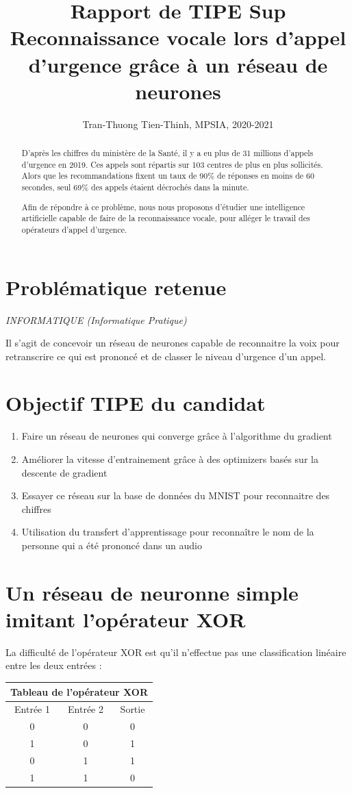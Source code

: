 \documentclass[12pt,a4paper, french]{article}
\title{Rapport de TIPE Sup \\
Reconnaissance vocale lors d'appel d'urgence grâce à un réseau de neurones}
\author{Tran-Thuong Tien-Thinh, MPSIA, 2020-2021}
\date{}
\begin{document}
\maketitle

\begin{abstract}
D'après les chiffres du ministère de la Santé, il y a eu plus de 31 millions d'appels d'urgence en 2019. Ces appels sont répartis sur 103 centres de plus en plus sollicités. Alors que les recommandations fixent un taux de 90\% de réponses en moins de 60 secondes, seul 69\% des appels étaient décrochés dans la minute.  

Afin de répondre à ce problème, nous nous proposons d'étudier une intelligence artificielle capable de faire de la reconnaissance vocale, pour alléger le travail des opérateurs d'appel d'urgence.
\end{abstract}

\section*{Problématique retenue}
\noindent\textit{INFORMATIQUE (Informatique Pratique)}

Il s’agit de concevoir un réseau de neurones capable de reconnaitre la voix pour retranscrire ce qui est prononcé et de classer le niveau d'urgence d'un appel.

\section*{Objectif TIPE du candidat}
\begin{enumerate}
    \item Faire un réseau de neurones qui converge grâce à l’algorithme du gradient
    \item Améliorer la vitesse d'entrainement grâce à des optimizers basés sur la descente de gradient
    \item Essayer ce réseau sur la base de données du MNIST pour reconnaitre des chiffres
    \item Utilisation du transfert d'apprentissage pour reconnaître le nom de la personne qui a été prononcé dans un audio
\end{enumerate}

\section{Un réseau de neuronne simple imitant l'opérateur XOR}
La difficulté de l'opérateur XOR est qu'il n'effectue pas une classification linéaire entre les deux entrées :
\begin{center}
\begin{tabular}{ |c|c||c|   }
 \hline
 \multicolumn{3}{|c|}{Tableau de l'opérateur XOR} \\
 \hline
 Entrée 1 & Entrée 2 & Sortie\\
 \hline
 0 & 0 & 0\\
 1 & 0 & 1\\
 0 & 1 & 1\\
 1 & 1 & 0\\
 \hline
\end{tabular}
\end{center}
\end{document}
